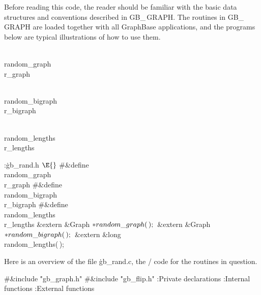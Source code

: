 Before reading this code, the reader should be familiar with the basic
data structures and conventions described in {\sc GB\_\,GRAPH}. The
routines in {\sc GB\_\,GRAPH} are loaded together with all GraphBase
applications, and the programs below are typical illustrations of how
to use them.

\Y\B\4\D\\{random\_graph}\5
\\{r\_graph}\par
\B\4\D\\{random\_bigraph}\5
\\{r\_bigraph}\par
\B\4\D\\{random\_lengths}\5
\\{r\_lengths}\par
\Y\B\4:\.{gb\_rand.h }\X${}\E{}$\6
\8\#\&{define} \\{random\_graph}\5\\{r\_graph}\6
\8\#\&{define} \\{random\_bigraph}\5\\{r\_bigraph}\6
\8\#\&{define} \\{random\_lengths}\5\\{r\_lengths}\6
\&{extern} \&{Graph} ${}{*}\\{random\_graph}(\,);{}$\6
\&{extern} \&{Graph} ${}{*}\\{random\_bigraph}(\,);{}$\6
\&{extern} \&{long} \\{random\_lengths}(\,);\par
\fi

Here is an overview of the file \.{gb\_rand.c}, the \CEE/ code for the
routines in question.

\Y\B\8\#\&{include} \.{"gb\_graph.h"}\6
\8\#\&{include} \.{"gb\_flip.h"}\6
\ATH\7
:Private declarations\X\6
:Internal functions\X\6
:External functions\X\par
\fi

